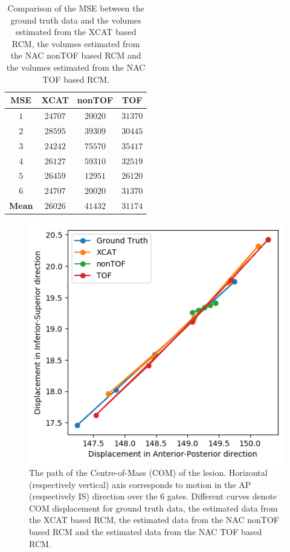 \documentclass[portrait,color=UCLburgundy,margin=3cm]{uclposter}
\begin{document}
\begin{multicols}{4}
\begin{table}
    \centering
    \small
    \caption{Comparison of the MSE between the ground truth data and the volumes estimated from the XCAT based RCM, the volumes estimated from the NAC nonTOF based RCM and the volumes estimated from the NAC TOF based RCM.}
    \begin{tabular}{||c|ccc||}
        \hline
            \textbf{MSE}    & \textbf{XCAT} & \textbf{nonTOF}   & \textbf{TOF}  \\
        \hline
            \textbf{$1$}    & $24707$       & $20020$           & $31370$       \\
            \textbf{$2$}    & $28595$       & $39309$           & $30445$       \\
            \textbf{$3$}    & $24242$       & $75570$           & $35417$       \\
            \textbf{$4$}    & $26127$       & $59310$           & $32519$       \\
            \textbf{$5$}    & $26459$       & $12951$           & $26120$       \\
            \textbf{$6$}    & $24707$       & $20020$           & $31370$       \\
        \hline
            \textbf{Mean}   & $26026$       & $41432$           & $31174$       \\
        \hline
    \end{tabular}
    \label{tab:mse}
\end{table}

\begin{figure}
    \centering
    \includegraphics[width=0.7\linewidth]{com_graph.png}
    \caption{The path of the Centre-of-Mass (COM) of the lesion. Horizontal (respectively vertical) axis corresponds to motion in the AP (respectively IS) direction over the $6$ gates. Different curves denote COM displacement for  ground truth data, the estimated data from the XCAT based RCM, the estimated data from the NAC nonTOF based RCM and the estimated data from the NAC TOF based RCM.}
    \label{fig:com_graph}
\end{figure}


\end{multicols}
\end{document}
